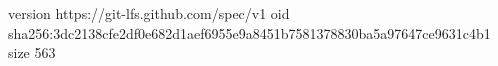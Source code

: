version https://git-lfs.github.com/spec/v1
oid sha256:3dc2138cfe2df0e682d1aef6955e9a8451b7581378830ba5a97647ce9631c4b1
size 563
